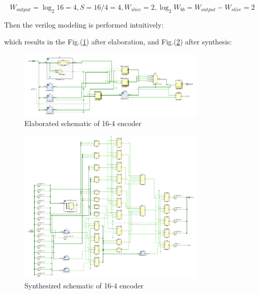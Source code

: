 \documentclass[journal, onecolumn]{IEEEtran}
\begin{document}
\begin{equation}
	W_{output}=\log_2 16=4, S=16/4=4, W_{slice}=2, \log_2 W_{bb}=W_{output}-W_{slice}=2
\end{equation}

Then the verilog modeling is performed intuitively:



which results in the Fig.(\ref{164_elaborated}) after elaboration, and Fig.(\ref{164_synthesis}) after synthesis:

\begin{figure}[htpb]
  \begin{center}
    \includegraphics[width=0.80\textwidth]{report_lab3.assets/encoder42_LUT_elab_1.pdf}
    \caption{Elaborated schematic of 16-4 encoder}
    \label{164_elaborated}
  \end{center}
\end{figure}

\begin{figure}[htpb]
  \begin{center}
    \includegraphics[width=0.80\textwidth]{report_lab3.assets/encoder42_LUT_1.pdf}
    \caption{Synthesized schematic of 16-4 encoder}
    \label{164_synthesis}
  \end{center}
\end{figure}
\end{document}
